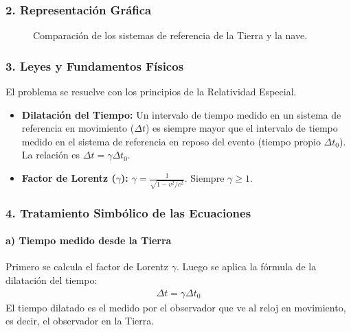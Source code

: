 \subsubsection*{2. Representación Gráfica}
\begin{figure}[H]
    \centering
    \caption{Comparación de los sistemas de referencia de la Tierra y la nave.}
\end{figure}

\subsubsection*{3. Leyes y Fundamentos Físicos}
El problema se resuelve con los principios de la Relatividad Especial.
\begin{itemize}
    \item \textbf{Dilatación del Tiempo:} Un intervalo de tiempo medido en un sistema de referencia en movimiento ($\Delta t$) es siempre mayor que el intervalo de tiempo medido en el sistema de referencia en reposo del evento (tiempo propio $\Delta t_0$). La relación es $\Delta t = \gamma \Delta t_0$.
    \item \textbf{Factor de Lorentz ($\gamma$):} $\gamma = \frac{1}{\sqrt{1 - v^2/c^2}}$. Siempre $\gamma \ge 1$.
\end{itemize}

\subsubsection*{4. Tratamiento Simbólico de las Ecuaciones}
\paragraph{a) Tiempo medido desde la Tierra}
Primero se calcula el factor de Lorentz $\gamma$. Luego se aplica la fórmula de la dilatación del tiempo:
\begin{gather}
    \Delta t = \gamma \Delta t_0
\end{gather}
El tiempo dilatado es el medido por el observador que ve al reloj en movimiento, es decir, el observador en la Tierra.
